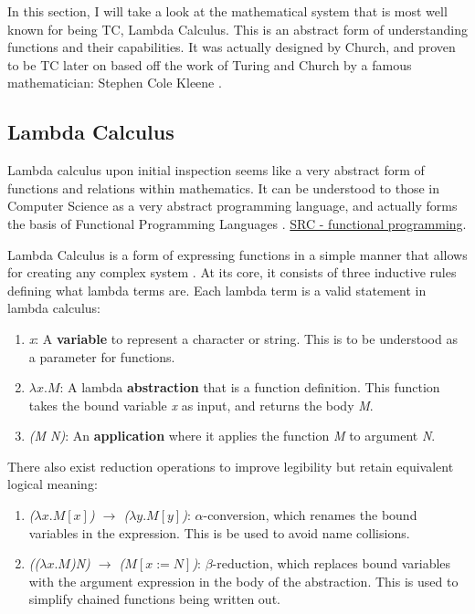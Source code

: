 In this section, I will take a look at the mathematical system that is most well known for being TC, Lambda Calculus.
This is an abstract form of understanding functions and their capabilities.
It was actually designed by Church, and proven to be TC later on based off the work of Turing and Church by a famous mathematician: Stephen Cole Kleene \cite{LambdaCalcKleene}.

\subsection{Lambda Calculus}\label{subsec:LambdaCalc}

Lambda calculus upon initial inspection seems like a very abstract form of functions and relations within mathematics.
It can be understood to those in Computer Science as a very abstract programming language, and actually forms the basis of Functional Programming Languages \cite{TutLambdaCalc}.
\href{https://learn.saylor.org/mod/book/tool/print/index.php?id=33044&chapterid=13087}{SRC - functional programming}.

Lambda Calculus is a form of expressing functions in a simple manner that allows for creating any complex system \cite{LambdaCalcRG}.
At its core, it consists of three inductive rules defining what lambda terms are.
Each lambda term is a valid statement in lambda calculus:
\begin{enumerate}
    \item \textit{x}: A \textbf{variable} to represent a character or string.
    This is to be understood as a parameter for functions.
    \item \textit{$\lambda x.M$}: A lambda \textbf{abstraction} that is a function definition.
    This function takes the bound variable \textit{x} as input, and returns the body \textit{M}.
    \item \textit{(M N)}: An \textbf{application} where it applies the function \textit{M} to argument \textit{N}.
\end{enumerate}

There also exist reduction operations to improve legibility but retain equivalent logical meaning:
\begin{enumerate}
    \item \textit{($\lambda x.M[x]$) $\rightarrow$ ($\lambda y.M[y]$)}: $\alpha$-conversion, which renames the bound variables in the expression.
    This is be used to avoid name collisions.
    \item \textit{(($\lambda x.M$)\textit{N}) $\rightarrow$ ($M[x:=N]$)}: $\beta$-reduction, which replaces bound variables with the argument expression in the body of the abstraction.
    This is used to simplify chained functions being written out.
\end{enumerate}

